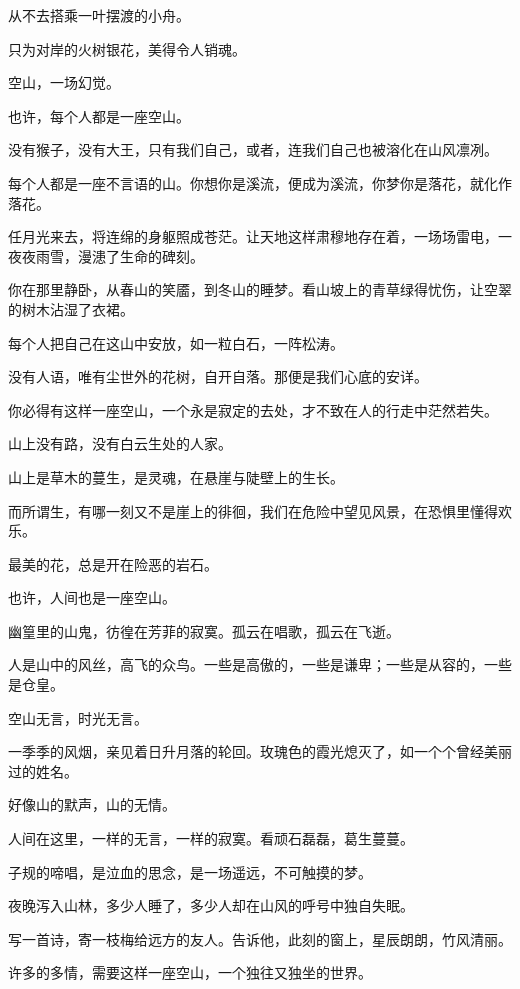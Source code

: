 \documentclass[12pt,a4paper]{article}
\def\blankrev{\vspace{1ex}}									%
\begin{document}
		从不去搭乘一叶摆渡的小舟。\par
		只为对岸的火树银花，美得令人销魂。

	\endwriting



		空山，一场幻觉。

		\blankrev
		也许，每个人都是一座空山。\par
		没有猴子，没有大王，只有我们自己，或者，连我们自己也被溶化在山风凛冽。

		\blankrev
		每个人都是一座不言语的山。你想你是溪流，便成为溪流，你梦你是落花，就化作落花。\par
		任月光来去，将连绵的身躯照成苍茫。让天地这样肃穆地存在着，一场场雷电，一夜夜雨雪，漫漶了生命的碑刻。\par
		你在那里静卧，从春山的笑靥，到冬山的睡梦。看山坡上的青草绿得忧伤，让空翠的树木沾湿了衣裙。\par
		每个人把自己在这山中安放，如一粒白石，一阵松涛。\par
		没有人语，唯有尘世外的花树，自开自落。那便是我们心底的安详。\par
		你必得有这样一座空山，一个永是寂定的去处，才不致在人的行走中茫然若失。\par
		山上没有路，没有白云生处的人家。\par
		山上是草木的蔓生，是灵魂，在悬崖与陡壁上的生长。\par
		而所谓生，有哪一刻又不是崖上的徘徊，我们在危险中望见风景，在恐惧里懂得欢乐。\par
		最美的花，总是开在险恶的岩石。

		\blankrev
		也许，人间也是一座空山。\par
		幽篁里的山鬼，彷徨在芳菲的寂寞。孤云在唱歌，孤云在飞逝。\par
		人是山中的风丝，高飞的众鸟。一些是高傲的，一些是谦卑；一些是从容的，一些是仓皇。\par
		空山无言，时光无言。\par
		一季季的风烟，亲见着日升月落的轮回。玫瑰色的霞光熄灭了，如一个个曾经美丽过的姓名。\par
		好像山的默声，山的无情。\par
		人间在这里，一样的无言，一样的寂寞。看顽石磊磊，葛生蔓蔓。\par
		子规的啼唱，是泣血的思念，是一场遥远，不可触摸的梦。\par
		夜晚泻入山林，多少人睡了，多少人却在山风的呼号中独自失眠。\par
		写一首诗，寄一枝梅给远方的友人。告诉他，此刻的窗上，星辰朗朗，竹风清丽。\par
		许多的多情，需要这样一座空山，一个独往又独坐的世界。
\end{document}
